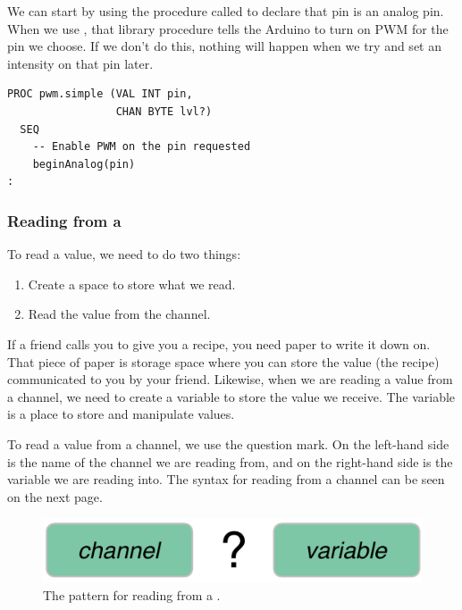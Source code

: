 We can start by using the \plumbing procedure called \bA to declare that pin \pineleven is an analog pin. When we use \bA, that library procedure tells the Arduino to turn on PWM for the pin we choose. If we don't do this, nothing will happen when we try and set an intensity on that pin later. 

\vspace{3mm}
\begin{lstlisting}
PROC pwm.simple (VAL INT pin, 
                 CHAN BYTE lvl?)
  SEQ
    -- Enable PWM on the pin requested
    beginAnalog(pin)
:
\end{lstlisting}

\subsubsection{Reading from a \CHANnel}
To read a value, we need to do two things:
\begin{enumerate}
	\item Create a space to store what we read.
	\item Read the value from the channel.
\end{enumerate}

If a friend calls you to give you a recipe, you need paper to write it down on. That piece of paper is storage space where you can store the value (the recipe) communicated to you by your friend. Likewise, when we are reading a value from a channel, we need to create a {\strong variable} to store the value we receive. The {\strong variable} is a place to store and manipulate values.

To read a value from a channel, we use the question mark. On the {\strong left-hand side} is the name of the {\strong channel we are reading from}, and on the {\strong right-hand} side is the {\strong variable we are reading into}. The syntax for reading from a channel can be seen on the next page.

\newpage

\vspace{3mm}
\begin{figure}[ht]
  \begin{center}
    \includegraphics[width=0.8\linewidth]{images/ch7-channel-read-pattern}
    \caption{The pattern for reading from a \CHANnel.}
    \label{image:ch7-channel-read-pattern}
  \end{center}
\end{figure}

